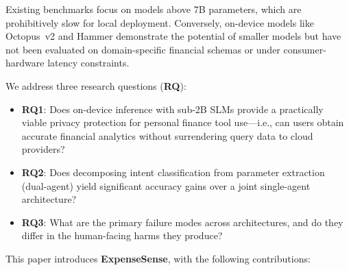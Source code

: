 \documentclass[11pt,twocolumn]{article}
\begin{document}
Existing benchmarks \citep{yan2024bfcl, qin2023toolllm,
finmcpbench2026, fintrace2026} focus on models above 7B parameters,
which are prohibitively slow for local deployment.
Conversely, on-device models like Octopus~v2 \citep{chen2024octopus}
and Hammer \citep{lin2024hammer} demonstrate the potential of smaller
models but have not been evaluated on domain-specific financial
schemas or under consumer-hardware latency constraints.

We address three research questions (\textbf{RQ}):

\begin{itemize}\itemsep=0pt \parskip=0pt \parsep=0pt
  \item \textbf{RQ1}: Does on-device inference with sub-2B SLMs
        provide a practically viable privacy protection for personal
        finance tool use---i.e., can users obtain accurate financial
        analytics without surrendering query data to cloud providers?
  \item \textbf{RQ2}: Does decomposing intent classification from
        parameter extraction (dual-agent) yield significant accuracy
        gains over a joint single-agent architecture?
  \item \textbf{RQ3}: What are the primary failure modes across
        architectures, and do they differ in the human-facing harms
        they produce?
\end{itemize}

This paper introduces \textbf{ExpenseSense}, with the following
contributions:
\end{document}
